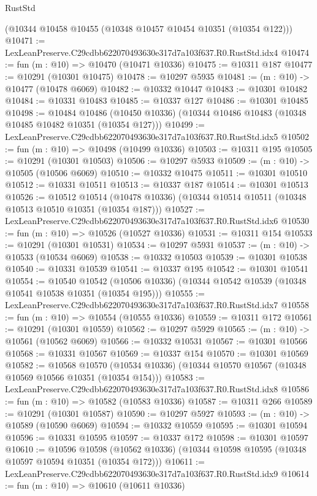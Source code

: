 \begin{lexlean}{RustStd}
\begin{coremodule}
    (@10344 @10458 @10455 (@10348 @10457 @10454 @10351 (@10354 @122)))
@10471 := LexLeanPreserve.C29cdbb622070493630e317d7a103f637.R0.RustStd.idx4
@10474 := fun (m : @10) => @10470 (@10471 @10336)
@10475 := @10311 @187
@10477 := @10291 (@10301 @10475)
@10478 := @10297 @5935
@10481 := (m : @10) -> @10477 (@10478 @6069)
@10482 := @10332 @10447
@10483 := @10301 @10482
@10484 := @10331 @10483
@10485 := @10337 @127
@10486 := @10301 @10485
@10498 := @10484
    @10486
    (@10450 @10336)
    (@10344 @10486 @10483 (@10348 @10485 @10482 @10351 (@10354 @127)))
@10499 := LexLeanPreserve.C29cdbb622070493630e317d7a103f637.R0.RustStd.idx5
@10502 := fun (m : @10) => @10498 (@10499 @10336)
@10503 := @10311 @195
@10505 := @10291 (@10301 @10503)
@10506 := @10297 @5933
@10509 := (m : @10) -> @10505 (@10506 @6069)
@10510 := @10332 @10475
@10511 := @10301 @10510
@10512 := @10331 @10511
@10513 := @10337 @187
@10514 := @10301 @10513
@10526 := @10512
    @10514
    (@10478 @10336)
    (@10344 @10514 @10511 (@10348 @10513 @10510 @10351 (@10354 @187)))
@10527 := LexLeanPreserve.C29cdbb622070493630e317d7a103f637.R0.RustStd.idx6
@10530 := fun (m : @10) => @10526 (@10527 @10336)
@10531 := @10311 @154
@10533 := @10291 (@10301 @10531)
@10534 := @10297 @5931
@10537 := (m : @10) -> @10533 (@10534 @6069)
@10538 := @10332 @10503
@10539 := @10301 @10538
@10540 := @10331 @10539
@10541 := @10337 @195
@10542 := @10301 @10541
@10554 := @10540
    @10542
    (@10506 @10336)
    (@10344 @10542 @10539 (@10348 @10541 @10538 @10351 (@10354 @195)))
@10555 := LexLeanPreserve.C29cdbb622070493630e317d7a103f637.R0.RustStd.idx7
@10558 := fun (m : @10) => @10554 (@10555 @10336)
@10559 := @10311 @172
@10561 := @10291 (@10301 @10559)
@10562 := @10297 @5929
@10565 := (m : @10) -> @10561 (@10562 @6069)
@10566 := @10332 @10531
@10567 := @10301 @10566
@10568 := @10331 @10567
@10569 := @10337 @154
@10570 := @10301 @10569
@10582 := @10568
    @10570
    (@10534 @10336)
    (@10344 @10570 @10567 (@10348 @10569 @10566 @10351 (@10354 @154)))
@10583 := LexLeanPreserve.C29cdbb622070493630e317d7a103f637.R0.RustStd.idx8
@10586 := fun (m : @10) => @10582 (@10583 @10336)
@10587 := @10311 @266
@10589 := @10291 (@10301 @10587)
@10590 := @10297 @5927
@10593 := (m : @10) -> @10589 (@10590 @6069)
@10594 := @10332 @10559
@10595 := @10301 @10594
@10596 := @10331 @10595
@10597 := @10337 @172
@10598 := @10301 @10597
@10610 := @10596
    @10598
    (@10562 @10336)
    (@10344 @10598 @10595 (@10348 @10597 @10594 @10351 (@10354 @172)))
@10611 := LexLeanPreserve.C29cdbb622070493630e317d7a103f637.R0.RustStd.idx9
@10614 := fun (m : @10) => @10610 (@10611 @10336)

\end{coremodule}
\end{lexlean}
